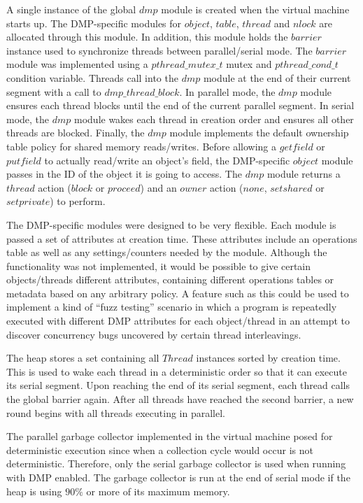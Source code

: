 
A single instance of the global $dmp$ module is created when the
virtual machine starts up.  The DMP-specific modules for $object$,
$table$, $thread$ and $nlock$ are allocated through this module.  In
addition, this module holds the $barrier$ instance used to synchronize
threads between parallel/serial mode.  The $barrier$ module was
implemented using a $pthread\_mutex\_t$ mutex and $pthread\_cond\_t$
condition variable.  Threads call into the $dmp$ module at the end of
their current segment with a call to $dmp\_thread\_block$.  In
parallel mode, the $dmp$ module ensures each thread blocks until the
end of the current parallel segment.  In serial mode, the $dmp$ module
wakes each thread in creation order and ensures all other threads are
blocked.  Finally, the $dmp$ module implements the default ownership
table policy for shared memory reads/writes.  Before allowing a
$getfield$ or $putfield$ to actually read/write an object's field, the
DMP-specific $object$ module passes in the ID of the object it is
going to access.  The $dmp$ module returns a $thread$ action ($block$
or $proceed$) and an $owner$ action ($none$, $set shared$ or $set
private$) to perform.

The DMP-specific modules were designed to be very flexible.  Each
module is passed a set of attributes at creation time.  These
attributes include an operations table as well as any
settings/counters needed by the module.  Although the functionality
was not implemented, it would be possible to give certain
objects/threads different attributes, containing different operations
tables or metadata based on any arbitrary policy.  A feature such as
this could be used to implement a kind of ``fuzz testing'' scenario in
which a program is repeatedly executed with different DMP attributes
for each object/thread in an attempt to discover concurrency bugs
uncovered by certain thread interleavings.

The heap stores a set containing all $Thread$ instances sorted by
creation time.  This is used to wake each thread in a deterministic
order so that it can execute its serial segment.  Upon reaching the
end of its serial segment, each thread calls the global barrier again.
After all threads have reached the second barrier, a new round begins
with all threads executing in parallel.

The parallel garbage collector implemented in the virtual machine
posed for deterministic execution since when a collection cycle would
occur is not deterministic.  Therefore, only the serial garbage
collector is used when running with DMP enabled.  The garbage
collector is run at the end of serial mode if the heap is using $90\%$
or more of its maximum memory.

